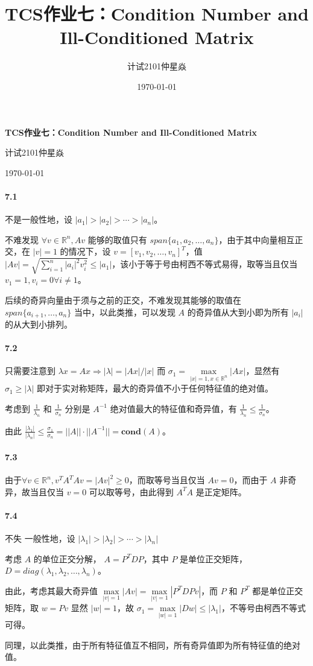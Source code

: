 \documentclass[12pt, a4paper, oneside]{ctexart}
\title{\textbf{TCS作业七：Condition Number and Ill-Conditioned Matrix}}
\author{计试2101仲星焱}
\date{\today}
\begin{document}
	\textbf{TCS作业七：Condition Number and Ill-Conditioned Matrix}
	
	计试2101仲星焱
	
	\today
	
	\paragraph{7.1}
	
	不是一般性地，设 $|a_1|>|a_2|>\cdots>|a_n|$。
	
	不难发现 $\forall v \in \mathbb R^n,Av$ 能够的取值只有 $\textit{span}\{a_1,a_2,\dots,a_n\}$，由于其中向量相互正交，在 $|v|=1$ 的情况下，设 $v=[v_1,v_2,\dots,v_n]^T$，值 $|Av|=\sqrt{\sum\limits_{i=1}^n|a_i|^2v_i^2}\leq |a_1|$，该小于等于号由柯西不等式易得，取等当且仅当 $v_1=1,v_i=0\forall i\neq 1$。
	
	后续的奇异向量由于须与之前的正交，不难发现其能够的取值在 $\textit{span}\{a_{i+1},\dots,a_n\}$ 当中，以此类推，可以发现 $A$ 的奇异值从大到小即为所有 $|a_i|$ 的从大到小排列。
	
	\paragraph{7.2}
	
	只需要注意到 $\lambda x = Ax\Rightarrow |\lambda|=|Ax|/|x|$ 而 $\sigma_1=\max\limits_{|x|=1,x\in \mathbb R^n}|Ax|$，显然有 $\sigma_1\geq |\lambda|$ 即对于实对称矩阵，最大的奇异值不小于任何特征值的绝对值。
		
	考虑到 $\frac{1}{\lambda_n}$ 和 $\frac{1}{\sigma_n}$ 分别是 $A^{-1}$ 绝对值最大的特征值和奇异值，有 $\frac{1}{\lambda_n} \leq \frac{1}{\sigma_n}$。
	
	由此 $\frac{|\lambda_1|}{|\lambda_n|}\leq \frac{\sigma_1}{\sigma_n}=||A||\cdot||A^{-1}||=\textbf{cond}(A)$。
	
	\paragraph{7.3} 由于$\forall v \in \mathbb R^n, v^TA^TAv=|Av|^2\geq 0$，而取等号当且仅当 $Av = 0$，而由于 $A$ 非奇异，故当且仅当 $v=0$ 可以取等号，由此得到 $A^TA$ 是正定矩阵。
	
	\paragraph{7.4} 
	不失 一般性地，设 $|\lambda_1|>|\lambda_2|>\cdots>|\lambda_n| $
	
	考虑 $A$ 的单位正交分解， $A=P^TDP$，其中 $P$ 是单位正交矩阵， $D=\textit{diag}(\lambda_1,\lambda_2,\dots,\lambda_n)$。 
	
	由此，考虑其最大奇异值 $\max\limits_{|v|=1}|Av|=\max\limits_{|v|=1}|P^TDPv|$，而 $P$ 和 $P^T$ 都是单位正交矩阵，取 $w=Pv$ 显然 $|w|=1$，故 $\sigma_1=\max\limits_{|w|=1}|Dw|\leq |\lambda_1|$，不等号由柯西不等式可得。
	
	同理，以此类推，由于所有特征值互不相同，所有奇异值即为所有特征值的绝对值。
	
\end{document}
